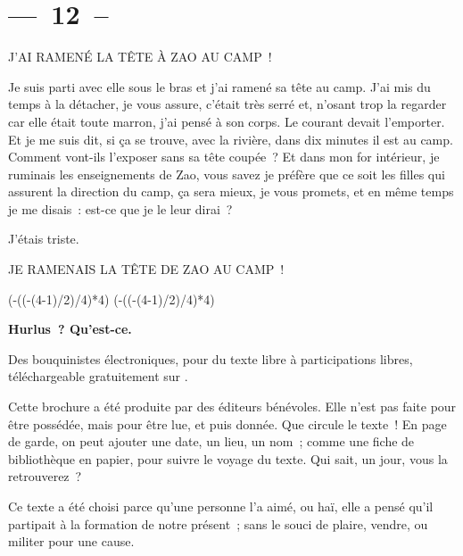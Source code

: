 \documentclass[french,twoside]{book} %
\newcommand{\dateline}[1]{\medskip{\RaggedLeft{#1}\par}\bigskip}
\def\truncdiv#1#2{((#1-(#2-1)/2)/#2)}
\def\moduloop#1#2{(#1-\truncdiv{#1}{#2}*#2)}
\def\modulo#1#2{\number\numexpr\moduloop{#1}{#2}\relax}
\begin{document}
\section[{— 12 –}]{— 12 –}
\renewcommand{\leftmark}{— 12 –}

\noindent J’AI RAMENÉ LA TÊTE À ZAO AU CAMP !\par
\bigbreak
\noindent Je suis parti avec elle sous le bras et j’ai ramené sa tête au camp. J’ai mis du temps à la détacher, je vous assure, c’était très serré et, n’osant trop la regarder car elle était toute marron, j’ai pensé à son corps. Le courant devait l’emporter. Et je me suis dit, si ça se trouve, avec la rivière, dans dix minutes il est au camp. Comment vont-ils l’exposer sans sa tête coupée ? Et dans mon for intérieur, je ruminais les enseignements de Zao, vous savez je préfère que ce soit les filles qui assurent la direction du camp, ça sera mieux, je vous promets, et en même temps je me disais : est-ce que je le leur dirai ?\par
J’étais triste.\par
\bigbreak
\noindent JE RAMENAIS LA TÊTE DE ZAO AU CAMP !\par

\dateline{Lille, octobre 2016}
 


\ifbooklet
  \pagestyle{empty}
  \clearpage
  \ifnum\modulo{\value{page}}{4}=0 \hbox{}\newpage\hbox{}\newpage\fi
  \ifnum\modulo{\value{page}}{4}=1 \hbox{}\newpage\hbox{}\newpage\fi


  \hbox{}\newpage
  \ifodd\value{page}\hbox{}\newpage\fi
  {\centering\color{rubric}\bfseries\noindent\large
    Hurlus ? Qu’est-ce.\par
    \bigskip
  }
  \noindent Des bouquinistes électroniques, pour du texte libre à participations libres,
  téléchargeable gratuitement sur \href{https://hurlus.fr}{}.\par
  \bigskip
  \noindent Cette brochure a été produite par des éditeurs bénévoles.
  Elle n’est pas faite pour être possédée, mais pour être lue, et puis donnée.
  Que circule le texte !
  En page de garde, on peut ajouter une date, un lieu, un nom ;
  comme une fiche de bibliothèque en papier,
  pour suivre le voyage du texte. Qui sait, un jour, vous la retrouverez ?
  \par

  Ce texte a été choisi parce qu’une personne l’a aimé,
  ou haï, elle a pensé qu’il partipait à la formation de notre présent ;
  sans le souci de plaire, vendre, ou militer pour une cause.
  \par
\end{document}

